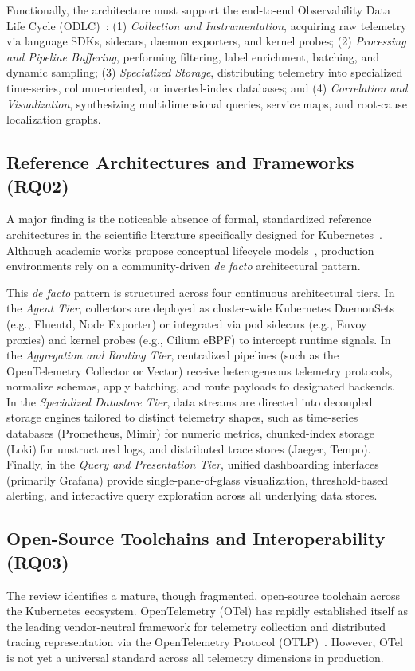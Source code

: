 \documentclass[sigconf, anonymous, balance=false]{acmart}
\begin{document}
Functionally, the architecture must support the end-to-end Observability Data Life Cycle (ODLC)~\cite{araujo_24, han_2024}: (1) \textit{Collection and Instrumentation}, acquiring raw telemetry via language SDKs, sidecars, daemon exporters, and kernel probes; (2) \textit{Processing and Pipeline Buffering}, performing filtering, label enrichment, batching, and dynamic sampling; (3) \textit{Specialized Storage}, distributing telemetry into specialized time-series, column-oriented, or inverted-index databases; and (4) \textit{Correlation and Visualization}, synthesizing multidimensional queries, service maps, and root-cause localization graphs.

\subsection{Reference Architectures and Frameworks (RQ02)}
A major finding is the noticeable absence of formal, standardized reference architectures in the scientific literature specifically designed for Kubernetes~\cite{araujo_24, kosinska_2023}. Although academic works propose conceptual lifecycle models~\cite{araujo_24, han_2024}, production environments rely on a community-driven \textit{de facto} architectural pattern.

This \textit{de facto} pattern is structured across four continuous architectural tiers. In the \textit{Agent Tier}, collectors are deployed as cluster-wide Kubernetes DaemonSets (e.g., Fluentd, Node Exporter) or integrated via pod sidecars (e.g., Envoy proxies) and kernel probes (e.g., Cilium eBPF) to intercept runtime signals. In the \textit{Aggregation and Routing Tier}, centralized pipelines (such as the OpenTelemetry Collector or Vector) receive heterogeneous telemetry protocols, normalize schemas, apply batching, and route payloads to designated backends. In the \textit{Specialized Datastore Tier}, data streams are directed into decoupled storage engines tailored to distinct telemetry shapes, such as time-series databases (Prometheus, Mimir) for numeric metrics, chunked-index storage (Loki) for unstructured logs, and distributed trace stores (Jaeger, Tempo). Finally, in the \textit{Query and Presentation Tier}, unified dashboarding interfaces (primarily Grafana) provide single-pane-of-glass visualization, threshold-based alerting, and interactive query exploration across all underlying data stores.

\subsection{Open-Source Toolchains and Interoperability (RQ03)}
The review identifies a mature, though fragmented, open-source toolchain across the Kubernetes ecosystem. OpenTelemetry (OTel) has rapidly established itself as the leading vendor-neutral framework for telemetry collection and distributed tracing representation via the OpenTelemetry Protocol (OTLP)~\cite{kosinska_2023, faseeha_2025}. However, OTel is not yet a universal standard across all telemetry dimensions in production. 
\end{document}
